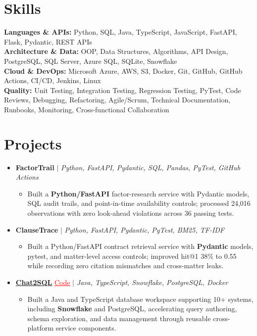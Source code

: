 \documentclass[letterpaper,10pt]{article}
\newcommand{\itemTail}{\vspace{-4pt}}
\newcommand{\sectionGap}{\vspace{-8pt}}
\newcommand{\projGap}{\vspace{3pt}}
\newcommand{\resumeItem}[1]{\item\small{{#1 \itemTail}}}
\newcommand{\resumeProjectHeading}[1]{\item \small #1 \vspace{-2pt}}
\newcommand{\resumeProjectLink}[2]{\href{#1}{\textcolor{red}{\underline{#2}}}}
\newcommand{\resumeSubHeadingListStart}{\begin{itemize}[leftmargin=0.0in, label={}]}
\newcommand{\resumeSubHeadingListEnd}{\end{itemize}}
\newcommand{\resumeProjItemListStart}{\begin{itemize}[leftmargin=0.15in,label=\textbullet,itemsep=3pt,topsep=0pt,parsep=0pt,partopsep=0pt]}
\newcommand{\resumeProjItemListEnd}{\end{itemize}\vspace{-4pt}}
\begin{document}
\section{Skills}
\begin{itemize}[leftmargin=0.15in, label={}]
\small{\item{
\textbf{Languages \& APIs:} Python, SQL, Java, TypeScript, JavaScript, FastAPI, Flask, Pydantic, REST APIs \\
\textbf{Architecture \& Data:} OOP, Data Structures, Algorithms, API Design, PostgreSQL, SQL Server, Azure SQL, SQLite, Snowflake \\
\textbf{Cloud \& DevOps:} Microsoft Azure, AWS, S3, Docker, Git, GitHub, GitHub Actions, CI/CD, Jenkins, Linux \\
\textbf{Quality:} Unit Testing, Integration Testing, Regression Testing, PyTest, Code Reviews, Debugging, Refactoring, Agile/Scrum, Technical Documentation, Runbooks, Monitoring, Cross-functional Collaboration
}}
\end{itemize}
\sectionGap
\section{Projects}
\resumeSubHeadingListStart
\vspace{3pt}
\resumeProjectHeading{\textbf{FactorTrail} $|$ \emph{Python, FastAPI, Pydantic, SQL, Pandas, PyTest, GitHub Actions}}
\resumeProjItemListStart
\resumeItem{Built a \textbf{Python/FastAPI} factor-research service with Pydantic models, SQL audit trails, and point-in-time availability controls; processed 24,016 observations with zero look-ahead violations across 36 passing tests.}
\resumeProjItemListEnd
\projGap
\resumeProjectHeading{\textbf{ClauseTrace} $|$ \emph{Python, FastAPI, Pydantic, PyTest, BM25, TF-IDF}}
\resumeProjItemListStart
\resumeItem{Built a Python/FastAPI contract retrieval service with \textbf{Pydantic} models, pytest, and matter-level access controls; improved hit@1 38\% to 0.55 while recording zero citation mismatches and cross-matter leaks.}
\resumeProjItemListEnd
\projGap
\resumeProjectHeading{\href{https://github.com/SAHAJ-BHADJA/Chat2SQL}{\textbf{Chat2SQL}} \resumeProjectLink{https://github.com/SAHAJ-BHADJA/Chat2SQL}{Code} $|$ \emph{Java, TypeScript, Snowflake, PostgreSQL, Docker}}
\resumeProjItemListStart
\resumeItem{Built a Java and TypeScript database workspace supporting 10+ systems, including \textbf{Snowflake} and PostgreSQL, accelerating query authoring, schema exploration, and data management through reusable cross-platform service components.}
\resumeProjItemListEnd
\resumeSubHeadingListEnd
\end{document}

